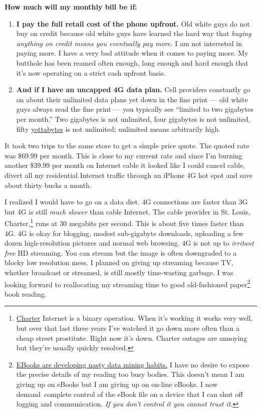 \textbf{How much will my monthly bill be if:}

\begin{enumerate}
\item
  \textbf{I pay the full retail cost of the phone upfront.} Old white
  guys do not buy on credit because old white guys have learned the hard
  way that \emph{buying anything on credit means you eventually pay
  more.} I am not interested in paying more. I have a very bad attitude
  when it comes to paying more. My butthole has been reamed often
  enough, long enough and hard enough that it's now operating on a
  strict cash upfront basis.
\item
  \textbf{And if I have an uncapped 4G data plan.} Cell providers
  constantly go on about their unlimited data plans yet down in the fine
  print --- old white guys always read the fine print --- you typically
  see ``limited to two gigabytes per month.'' Two gigabytes is not
  unlimited, four gigabytes is not unlimited, fifty
  \href{https://en.wikipedia.org/wiki/Yottabyte}{yottabytes} is not
  unlimited; unlimited means arbitrarily high.
\end{enumerate}

It took two trips to the same store to get a simple price quote. The
quoted rate was \$69.99 per month. This is close to my current rate and
since I'm burning another \$39.99 per month on Internet cable it looked
like I could cancel cable, divert all my residential Internet traffic
through an iPhone 4G hot spot and save about thirty bucks a month.

I realized I would have to go on a data diet. 4G connections are faster
than 3G but 4G is still \emph{much slower} than cable Internet. The
cable provider in St. Louis, Charter,\footnote{
\href{https://www.charter.com/}{Charter} Internet is a binary
operation. When it's working it works very well, but over that last
three years I've watched it go down more often than a cheap street
prostitute. Right now it's down. Charter outages are annoying but
they're usually quickly resolved.
} runs at 30 megabits per second. This is about five times faster than 4G.
4G is okay for blogging, modest sub-gigabyte downloads, uploading a few
dozen high-resolution pictures and normal web browsing. 4G is not up to
\emph{irritant free} HD streaming. You can stream but the image is often
downgraded to a blocky low resolution mess. I planned on giving up
streaming because TV, whether broadcast or streamed, is still mostly
time-wasting garbage. I was looking forward to reallocating my streaming
time to good old-fashioned paper\footnote{
  \href{http://online.wsj.com/news/articles/SB10001424052702304870304577490950051438304}{EBooks
  are developing nasty data mining habits.} I have no desire to expose
  the precise details of my reading too busy bodies. This doesn't mean I
  am giving up on eBooks but I am giving up on on-line eBooks. I now
  demand~complete control of the eBook file on a device that I can shut
  off logging and communication. \emph{If you don't control it you
  cannot trust it.}
} book reading.

